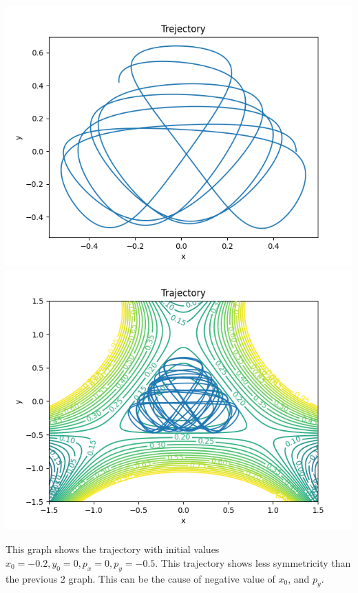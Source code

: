 \documentclass{article}
\begin{document}
	\includegraphics[scale=0.5]{./Ject6000.png}
	\includegraphics[scale=0.5]{./Ject6000_with_contour.png}

	This graph shows the trajectory with initial values $x_0 = -0.2, y_0 = 0, p_x = 0, p_y = -0.5$. This trajectory shows less symmetricity than
	the previous 2 graph. This can be the cause of negative value of $x_0$, and $p_y$.
\end{document}
